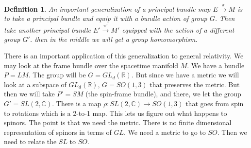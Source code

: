 \documentclass[11pt]{book}
\newtheorem{definition}[theorem]{Definition}
\begin{document}
\begin{definition}
An important generalization of a principal bundle map $E \xrightarrow{\pi} M$ is to take a principal bundle and equip it with
a bundle action of group $G$. Then take another principal bundle $E' \xrightarrow{\pi'} M'$ equipped with the action
of a different group $G'$. then in the middle we will get a group homomorphism.
\end{definition}


There is an important application of this generalization to general relativity. We may look at
the frame bundle over the spacetime manifold $M$. We have a bundle $P = LM$. The group will be $G = GL_d(\mathbb R)$.
But since we have a metric we will look at a subspace of $GL_d(\mathbb R)$,  $G = SO(1, 3)$ that preserves
the metric.  But then we will take $P' = SM$ (the spin-frame bundle), and there, we let the group
$G' = SL(2, \mathbb C)$.  There is a map $\rho: SL(2, \mathbb C) \rightarrow SO(1, 3)$ that goes from
spin to rotations which is a 2-to-1 map. This lets us figure out what happens to spinors. The point is
that we need the metric. There is no finite dimensional representation of spinors in terms of $GL$.
We need a metric to go to $SO$. Then we need to relate the $SL$ to $SO$.
\end{document}
